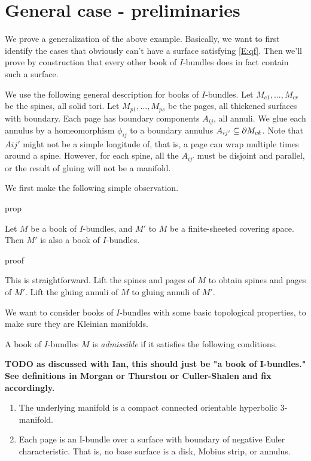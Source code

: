 \section{General case - preliminaries}

We prove a generalization of the above example. Basically, we want to first
identify the cases that obviously can't have a surface satisfying \eqref{E:qf}.
Then we'll prove by construction that every other book of $I$-bundles does in
fact contain such a surface.

We use the following general description for books of $I$-bundles. Let
$M_{c1},...,M_{cr}$ be the spines, all solid tori. Let $M_{p1},...,M_{ps}$ be
the pages, all thickened surfaces with boundary. Each page has boundary
components $A_{ij}$, all annuli. We glue each annulus by a homeomorphism
$\phi_{ij}$ to a boundary annulus $A_{ij'}\subseteq \partial M_{ck}$. Note that $Aij'$
might not be a simple longitude of, that is, a page can wrap multiple times
around a spine.  However, for each spine, all the $A_{ij'}$ must be disjoint
and parallel, or the result of gluing will not be a manifold.

We first make the following simple observation.

prop

Let $M$ be a book of $I$-bundles, and $M'$ to $M$ be a finite-sheeted covering
space.  Then $M'$ is also a book of $I$-bundles.

proof

This is straightforward. Lift the spines and pages of $M$ to obtain spines and
pages of $M'$. Lift the gluing annuli of $M$ to gluing annuli of $M'$.

We want to consider books of $I$-bundles with some basic topological
properties, to make sure they are Kleinian manifolds.

\begin{defn}

A book of $I$-bundles $M$ is \emph{admissible} if it satisfies the following
conditions.

\textbf{TODO as discussed with Ian, this should just be "a book of I-bundles."
See definitions in Morgan or Thurston or Culler-Shalen and fix accordingly.}

\begin{enumerate}

\item The underlying manifold is a compact connected orientable hyperbolic
3-manifold.

\item Each page is an I-bundle over a surface with boundary of negative Euler
characteristic.  That is, no base surface is a disk, Mobius strip, or annulus.

\end{enumerate}

\end{defn}

